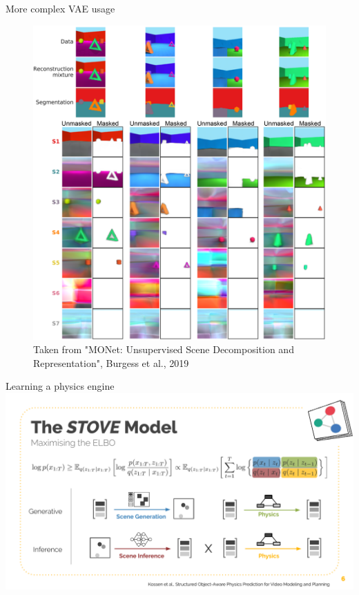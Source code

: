 \documentclass[10pt,aspectratio=169]{beamer}
\begin{document}
\begin{frame}{More complex VAE usage}
    \begin{figure}
        \includegraphics[height=0.7\textheight]{figs/monet_oir_decomposition_masked.png}
        \caption{Taken from "MONet: Unsupervised Scene Decomposition and Representation", Burgess et al., 2019}
    \end{figure}
\end{frame}

\begin{frame}{Learning a physics engine}
    \includegraphics[width=\textwidth]{figs/stove-6.pdf}

\end{frame}
\end{document}
